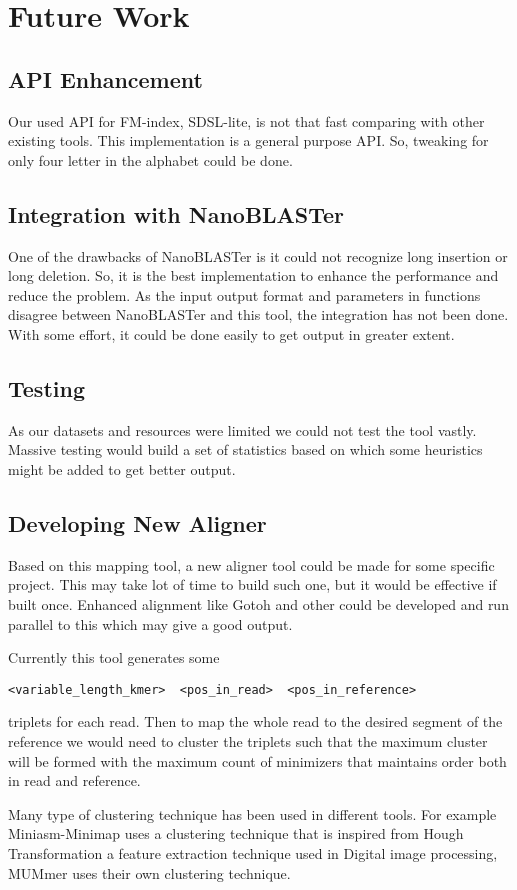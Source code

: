 \documentclass{standalone}
\begin{document}
\section{Future Work}
\subsection{API Enhancement}
Our used API for FM-index, SDSL-lite\cite{SDSL}, is not that fast comparing with other existing tools. This implementation is a general purpose API. So, tweaking for only four letter in the alphabet could be done.
\subsection{Integration with NanoBLASTer}
One of the drawbacks of NanoBLASTer\cite{nanoBLAST} is it could not recognize long insertion or long deletion. So, it is the best implementation to enhance the performance and reduce the problem. As the input output format and parameters in functions disagree between NanoBLASTer and this tool, the integration has not been done. With some effort, it could be done easily to get output in greater extent.
\subsection{Testing}
As our datasets and resources were limited we could not test the tool vastly. Massive testing would build a set of statistics based on which some heuristics might be added to get better output. 
\subsection{Developing New Aligner}
Based on this mapping tool, a new aligner tool could be made for some specific project. This may take lot of time to build such one, but it would be effective if built once. Enhanced alignment like Gotoh\cite{gotoh,gotoh1} and other could be developed and run parallel to this which may give a good output.
\par 
Currently this tool generates some  
\begin{verbatim}
<variable_length_kmer>  <pos_in_read>  <pos_in_reference>
\end{verbatim}
triplets for each read. Then to map the whole read to the desired segment of the reference we would need to cluster the triplets such that the maximum cluster will be formed with the maximum count of minimizers that maintains order both in read and reference.
\par 
Many type of clustering technique has been used in different tools. For example Miniasm-Minimap\cite{minimap} uses a clustering technique that is inspired from Hough Transformation\cite{HT1, HT2} a feature extraction technique used in Digital image processing, MUMmer uses their own clustering technique.	  
\end{document}
